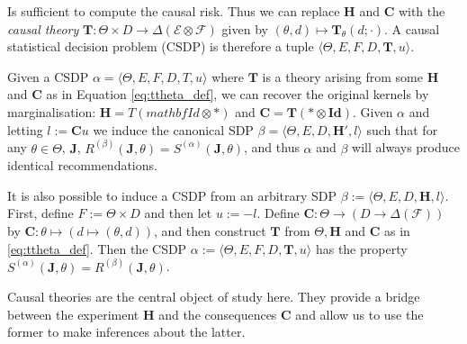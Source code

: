 Is sufficient to compute the causal risk. Thus we can replace $\mathbf{H}$ and $\mathbf{C}$ with the \emph{causal theory} $\mathbf{T}:\Theta\times D\to \Delta(\mathcal{E}\otimes\mathcal{F})$ given by $(\theta,d)\mapsto \mathbf{T}_\theta(d;\cdot)$. A causal statistical decision problem (CSDP) is therefore a tuple $\langle \Theta, E, F, D, \mathbf{T}, u\rangle$.

Given a CSDP $\alpha = \langle \Theta, E, F, D, T, u\rangle$ where $\mathbf{T}$ is a theory arising from some $\mathbf{H}$ and $\mathbf{C}$ as in Equation \ref{eq:ttheta_def}, we can recover the original kernels by marginalisation: $\mathbf{H}= T(mathbf{Id}\otimes *)$ and $\mathbf{C}=\mathbf{T}(*\otimes \mathbf{Id})$. Given $\alpha$ and letting $l:= \mathbf{C}u$ we induce the canonical SDP $\beta=\langle \Theta, E, D, \mathbf{H}', l\rangle$ such that for any $\theta\in \Theta$, $\mathbf{J}$, $R^{(\beta)}(\mathbf{J},\theta) = S^{(\alpha)}(\mathbf{J},\theta)$, and thus $\alpha$ and $\beta$ will always produce identical recommendations.

It is also possible to induce a CSDP from an arbitrary SDP $\beta:=\langle \Theta, E, D, \mathbf{H}, l\rangle$. First, define $F:=\Theta\times D$ and then let $u:=-l$. Define $\mathbf{C}:\Theta\to (D\to \Delta(\mathcal{F}))$ by $\mathbf{C}:\theta\mapsto (d\mapsto (\theta,d))$, and then construct $\mathbf{T}$ from $\Theta, \mathbf{H}$ and $\mathbf{C}$ as in \ref{eq:ttheta_def}. Then the CSDP $\alpha:=\langle \Theta, E, F, D, \mathbf{T}, u\rangle$ has the property $S^{(\alpha)}(\mathbf{J}, \theta) = R^{(\beta)}(\mathbf{J},\theta)$.

Causal theories are the central object of study here. They provide a bridge between the experiment $\mathbf{H}$ and the consequences $\mathbf{C}$ and allow us to use the former to make inferences about the latter. 